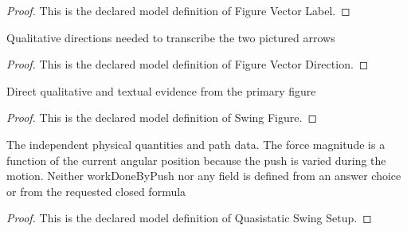 \begin{proof}
  This is the declared model definition of Figure Vector Label.
\end{proof}
\begin{definition}
  \label{def:physics:phyx-mini-0809:phyxminiproblems-problemphyxmini0809-figurevectordirection}
  Qualitative directions needed to transcribe the two pictured arrows
\end{definition}
\begin{proof}
  This is the declared model definition of Figure Vector Direction.
\end{proof}
\begin{definition}
  \label{def:physics:phyx-mini-0809:phyxminiproblems-problemphyxmini0809-swingfigure}
  Direct qualitative and textual evidence from the primary figure
\end{definition}
\begin{proof}
  This is the declared model definition of Swing Figure.
\end{proof}
\begin{definition}
  \label{def:physics:phyx-mini-0809:phyxminiproblems-problemphyxmini0809-quasistaticswingsetup}
  The independent physical quantities and path data. The force magnitude is a function of the current angular position because the push is varied during the motion. Neither workDoneByPush nor any field is defined from an answer choice or from the requested closed formula
\end{definition}
\begin{proof}
  This is the declared model definition of Quasistatic Swing Setup.
\end{proof}
